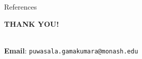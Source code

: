 \documentclass[11pt,xcolor=dvipsnames,handout]{beamer}
\begin{document}
%
%
%
%
%
%
%
\begin{frame}[allowframebreaks]{References}
\printbibliography
\end{frame}
%
\begin{frame}{}
\begin{center}
	
	\begin{LARGE} \bf THANK YOU!\end{LARGE} \\[1cm]
	{\color{monashblue} \bf Email}: \texttt{puwasala.gamakumara@monash.edu}
\end{center}
\end{frame}

\end{document}
